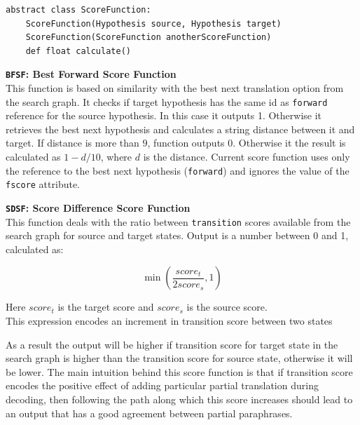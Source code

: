 \begin{verbatim}
abstract class ScoreFunction:
    ScoreFunction(Hypothesis source, Hypothesis target)
    ScoreFunction(ScoreFunction anotherScoreFunction)
    def float calculate()
\end{verbatim}


\begin{flushleft}

\textbf{\texttt{BFSF}: \textbf{Best Forward Score Function}} \\
This function is based on similarity with the best next translation option from the search graph. It checks if target hypothesis has the same id as \texttt{forward} reference for the source hypothesis. In this case it outputs 1. Otherwise it retrieves the best next hypothesis and calculates a string distance between it and target. If distance is more than $9$, function outputs $0$. Otherwise it the result is calculated as $1-d/10$, where $d$ is the distance. Current score function uses only the reference to the best next hypothesis (\texttt{forward}) and ignores the value of the \texttt{fscore} attribute.  \\
\bigskip

\textbf{\texttt{SDSF}: \textbf{Score Difference Score Function}} \\
This function deals with the ratio between \texttt{transition} scores available from the search graph for source and target states. Output is a number between 0 and 1, calculated as:
\begin{large}
\begin{equation}
\min(\frac{score_{t}}{2 score_{s}}, 1)
\end{equation}
\end{large}
\begin{center}
Here $score_{t}$ is the target score and $score_{s}$ is the source score. \\
This expression encodes an increment in transition score between two states
\end{center}

As a result the output will be higher if transition score for target state in the search graph is higher than the transition score for source state, otherwise it will be lower. The main intuition behind this score function is that if transition score encodes the positive effect of adding particular partial translation during decoding, then following the path along which this score increases should lead to an output that has a good agreement between partial paraphrases.
\bigskip



\end{flushleft}
